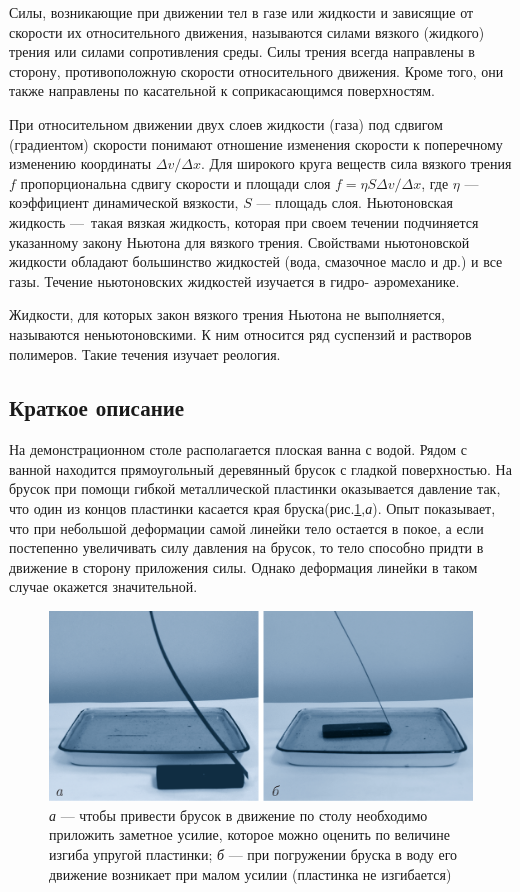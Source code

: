 \documentclass[All.tex]{subfiles}
\begin{document}
	Силы, возникающие при движении тел в газе или жидкости 
	и зависящие от скорости их относительного движения, называются 
	силами вязкого (жидкого) трения или силами сопротивления среды. 
	Силы трения всегда направлены в сторону, противоположную скорости относительного 
	движения.
	Кроме того, они также направлены по касательной к соприкасающимся поверхностям.
		
	При относительном движении двух слоев жидкости (газа) под сдвигом (градиентом) скорости понимают отношение изменения скорости к поперечному изменению координаты $\Delta v / \Delta x $. Для широкого круга веществ сила вязкого трения $f$ пропорциональна сдвигу скорости и площади слоя $f = \eta S \Delta v / \Delta x$, где $\eta $ — коэффициент динамической вязкости, $S$ — площадь слоя.
	Ньютоновская жидкость — такая вязкая жидкость, которая при своем течении подчиняется указанному закону Ньютона для вязкого трения.
	Свойствами ньютоновской жидкости обладают большинство жидкостей (вода, смазочное масло и др.) и все газы. 
	Течение ньютоновских жидкостей изучается в гидро- аэромеханике. 
	
	Жидкости, для которых закон вязкого трения Ньютона не выполняется, называются неньютоновскими.
	К ним относится ряд суспензий и растворов полимеров. 
	Такие течения изучает реология.

	\subsection*{\textcolor{PineGreen}{Краткое описание}}
	
	На демонстрационном столе располагается плоская ванна с водой.
	Рядом с ванной находится прямоугольный деревянный брусок с гладкой поверхностью.
	На брусок при помощи гибкой металлической пластинки оказывается давление так, что один из концов пластинки касается края бруска(рис.\ref{friction-2},\textit{а}).
	Опыт показывает, что при небольшой деформации самой линейки тело остается в покое, 
	а если постепенно увеличивать силу давления на брусок, то тело способно придти в движение в сторону приложения силы.
	Однако деформация линейки в таком случае окажется значительной.
		
		\begin{figure}[H] 
			\centering 	
			\includegraphics[width=0.9\linewidth]{friction-2.png}
			\caption{\textit{а} — чтобы привести брусок в движение по столу необходимо приложить заметное усилие, которое можно оценить по величине изгиба упругой пластинки; \textit{б} — при погружении бруска в воду его движение возникает при малом усилии (пластинка не изгибается) }
			\label{friction-2}
		\end{figure}
	
\end{document}
